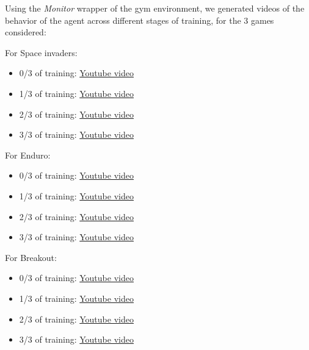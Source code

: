\documentclass{article}
\begin{document}



Using the \textit{Monitor} wrapper of the gym environment, we generated videos of the behavior of the agent across different stages of training, for the 3 games considered:

For Space invaders:
\begin{itemize}
  \item 0/3 of training: \href{http://www.sharelatex.com}{Youtube video}
  \item 1/3 of training: \href{http://www.sharelatex.com}{Youtube video}
  \item 2/3 of training: \href{http://www.sharelatex.com}{Youtube video}
  \item 3/3 of training: \href{http://www.sharelatex.com}{Youtube video}
\end{itemize}

For Enduro:
\begin{itemize}
  \item 0/3 of training: \href{http://www.sharelatex.com}{Youtube video}
  \item 1/3 of training: \href{http://www.sharelatex.com}{Youtube video}
  \item 2/3 of training: \href{http://www.sharelatex.com}{Youtube video}
  \item 3/3 of training: \href{http://www.sharelatex.com}{Youtube video}
\end{itemize}

For Breakout:
\begin{itemize}
  \item 0/3 of training: \href{http://www.sharelatex.com}{Youtube video}
  \item 1/3 of training: \href{http://www.sharelatex.com}{Youtube video}
  \item 2/3 of training: \href{http://www.sharelatex.com}{Youtube video}
  \item 3/3 of training: \href{http://www.sharelatex.com}{Youtube video}
\end{itemize}
\end{document}
